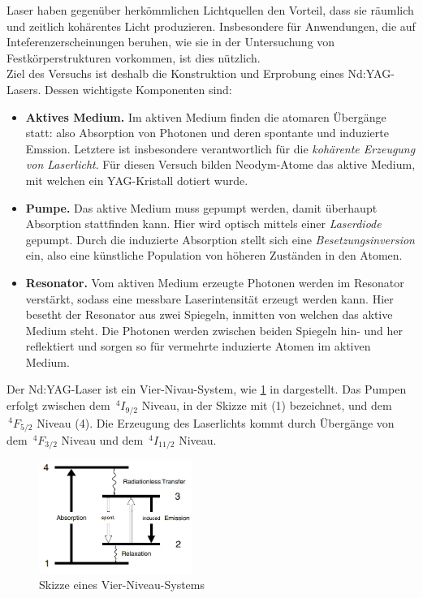 \documentclass[../main.tex]{subfiles}
\begin{document}
    Laser haben gegenüber herkömmlichen Lichtquellen den Vorteil, dass sie räumlich und zeitlich kohärentes Licht produzieren. Insbesondere für Anwendungen, die auf Inteferenzerscheinungen beruhen, wie sie in der Untersuchung von Festkörperstrukturen vorkommen, ist dies nützlich.\\

    Ziel des Versuchs ist deshalb die Konstruktion und Erprobung eines Nd:YAG-Lasers. Dessen wichtigste Komponenten sind:
    \begin{itemize}
        \item \textbf{Aktives Medium.} Im aktiven Medium finden die atomaren Übergänge statt: also Absorption von Photonen und deren spontante und induzierte Emssion. Letztere ist insbesondere verantwortlich für die \textit{kohärente Erzeugung von Laserlicht}. Für diesen Versuch bilden Neodym-Atome das aktive Medium, mit welchen ein YAG-Kristall dotiert wurde. 
        \item \textbf{Pumpe.} Das aktive Medium muss gepumpt werden, damit überhaupt Absorption stattfinden kann. Hier wird optisch mittels einer \textit{Laserdiode} gepumpt. Durch die induzierte Absorption stellt sich eine \textit{Besetzungsinversion} ein, also eine künstliche Population von höheren Zuständen in den Atomen. 
        \item \textbf{Resonator.} Vom aktiven Medium erzeugte Photonen werden im Resonator verstärkt, sodass eine messbare Laserintensität erzeugt werden kann. Hier besetht der Resonator aus zwei Spiegeln, inmitten von welchen das aktive Medium steht. Die Photonen werden zwischen beiden Spiegeln hin- und her reflektiert und sorgen so für vermehrte induzierte Atomen im aktiven Medium. 
    \end{itemize}
    
    Der Nd:YAG-Laser ist ein Vier-Nivau-System, wie \ref{fig:Einleitung:VierNivauSystem} in dargestellt. Das Pumpen erfolgt zwischen dem $\,^4 I_{9/2}$ Niveau, in der Skizze mit (1) bezeichnet, und dem $\,^4 F_{5/2}$ Niveau (4). Die Erzeugung des Laserlichts kommt durch Übergänge von dem $\,^4 F_{3/2}$ Niveau und dem $\,^4 I_{11/2}$ Niveau.

    \begin{figure}[H]
        \centering
        \includegraphics[width=5cm]{Bilddateien/Vier-Niveau-System.jpg}
        \caption{Skizze eines Vier-Niveau-Systems \cite[p.6]{doc:experiment08}}
        \label{fig:Einleitung:VierNivauSystem}
    \end{figure}
\end{document}
